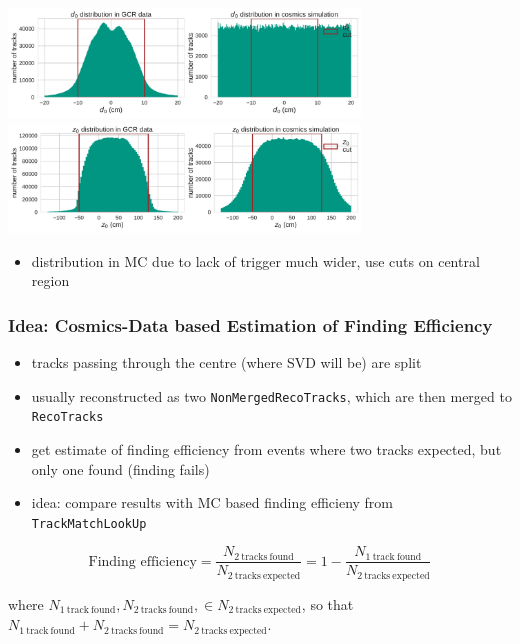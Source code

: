 \documentclass[18pt]{beamer}
\begin{document}
  \begin{frame}
    \begin{center}
      \includegraphics[width=0.7\textwidth]{figures/distributions/gcr_d0_distribution_uncut.pdf}\\
      \includegraphics[width=0.7\textwidth]{figures/distributions/gcr_z0_distribution_uncut.pdf}
    \end{center}
    \begin{itemize}
    \item distribution in MC due to lack of trigger much wider, use cuts on central region
    \end{itemize}
  \end{frame}

  \begin{frame}
    \frametitle{Idea: Cosmics-Data based Estimation of Finding Efficiency}
    \begin{itemize}
    \item tracks passing through the centre (where SVD will be) are split
    \item usually reconstructed as two \texttt{NonMergedRecoTracks},
      which are then merged to \texttt{RecoTracks}
    \item get estimate of finding efficiency from events where two tracks expected, but only one found (finding fails)
    \item idea: compare results with MC based finding efficieny from \texttt{TrackMatchLookUp}
    \end{itemize}
    \pause
    \begin{block}{}
      \begin{equation*}
        \label{eq:cosmic_eff}
        \text{Finding efficiency} = \frac{N_\mathrm{2\ tracks\ found}}{N_\mathrm{2\ tracks\ expected}}
        = 1 - \frac{N_\mathrm{1\ track\ found}}{N_\mathrm{2\ tracks\ expected}}
      \end{equation*}             %
    \end{block}
    where $N_\mathrm{1\ track\ found}, N_\mathrm{2\ tracks\ found}, \in N_\mathrm{2\ tracks\ expected}$, so that $N_\mathrm{1\ track\ found} + N_\mathrm{2\ tracks\ found} = N_\mathrm{2\ tracks\ expected}$.
  \end{frame}
\end{document}
